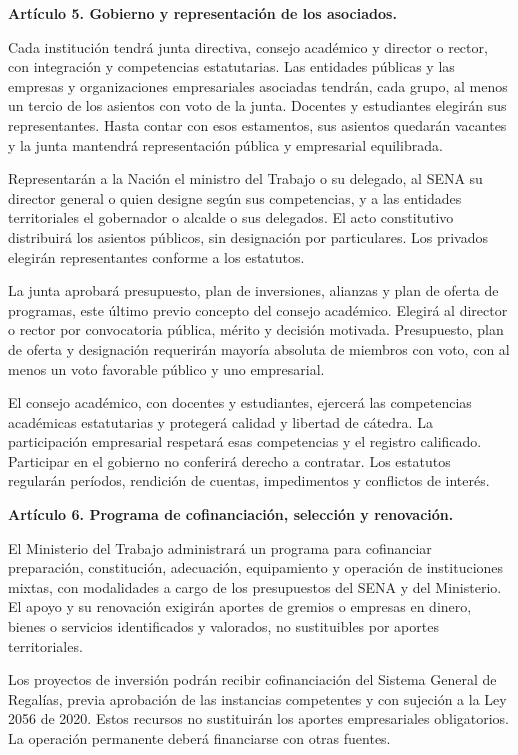 \begin{mdframed}[linewidth=0.6pt,linecolor=gray!60,backgroundcolor=gray!3,
  innertopmargin=10pt,innerbottommargin=10pt,innerleftmargin=10pt,innerrightmargin=10pt]
\textbf{Artículo 5. Gobierno y representación de los asociados.}

Cada institución tendrá junta directiva, consejo académico y director o rector, con integración y competencias estatutarias. Las entidades públicas y las empresas y organizaciones empresariales asociadas tendrán, cada grupo, al menos un tercio de los asientos con voto de la junta. Docentes y estudiantes elegirán sus representantes. Hasta contar con esos estamentos, sus asientos quedarán vacantes y la junta mantendrá representación pública y empresarial equilibrada.

Representarán a la Nación el ministro del Trabajo o su delegado, al SENA su director general o quien designe según sus competencias, y a las entidades territoriales el gobernador o alcalde o sus delegados. El acto constitutivo distribuirá los asientos públicos, sin designación por particulares. Los privados elegirán representantes conforme a los estatutos.

La junta aprobará presupuesto, plan de inversiones, alianzas y plan de oferta de programas, este último previo concepto del consejo académico. Elegirá al director o rector por convocatoria pública, mérito y decisión motivada. Presupuesto, plan de oferta y designación requerirán mayoría absoluta de miembros con voto, con al menos un voto favorable público y uno empresarial.

El consejo académico, con docentes y estudiantes, ejercerá las competencias académicas estatutarias y protegerá calidad y libertad de cátedra. La participación empresarial respetará esas competencias y el registro calificado. Participar en el gobierno no conferirá derecho a contratar. Los estatutos regularán períodos, rendición de cuentas, impedimentos y conflictos de interés.

\textbf{Artículo 6. Programa de cofinanciación, selección y renovación.}

El Ministerio del Trabajo administrará un programa para cofinanciar preparación, constitución, adecuación, equipamiento y operación de instituciones mixtas, con modalidades a cargo de los presupuestos del SENA y del Ministerio. El apoyo y su renovación exigirán aportes de gremios o empresas en dinero, bienes o servicios identificados y valorados, no sustituibles por aportes territoriales.

Los proyectos de inversión podrán recibir cofinanciación del Sistema General de Regalías, previa aprobación de las instancias competentes y con sujeción a la Ley 2056 de 2020. Estos recursos no sustituirán los aportes empresariales obligatorios. La operación permanente deberá financiarse con otras fuentes.


\end{mdframed}
